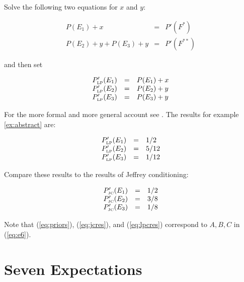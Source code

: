 \documentclass[11pt]{article} \usepackage{october} \onehalfspacing
\begin{document}
Solve the following two equations for $x$ and $y$:

\begin{equation}
  \label{eq:lpce}
  \begin{array}{rcl}
    P(E_{1})+x&=&P'(F^{*}) \\
    P(E_{2})+y+P(E_{3})+y&=&P'(F^{**})
  \end{array}
\end{equation}

and then set

\begin{equation}
  \label{eq:lpcf}
  \begin{array}{rcl}
    P'_{\mbox{\tiny LP}}(E_{1})&=&P(E_{1})+x \\
    P'_{\mbox{\tiny LP}}(E_{2})&=&P(E_{2})+y \\
    P'_{\mbox{\tiny LP}}(E_{3})&=&P(E_{3})+y
  \end{array}
\end{equation}

For the more formal and more general account see
. The results for example
\ref{ex:abstract} are:

\begin{equation}
  \label{eq:lpcres}
  \begin{array}{rcl}
    P'_{\mbox{\tiny LP}}(E_{1})&=&1/2 \\
    P'_{\mbox{\tiny LP}}(E_{2})&=&5/12 \\
    P'_{\mbox{\tiny LP}}(E_{3})&=&1/12
  \end{array}
\end{equation}

Compare these results to the results of Jeffrey conditioning:

\begin{equation}
  \label{eq:jcres}
  \begin{array}{rcl}
    P'_{\mbox{\tiny JC}}(E_{1})&=&1/2 \\
    P'_{\mbox{\tiny JC}}(E_{2})&=&3/8 \\
    P'_{\mbox{\tiny JC}}(E_{3})&=&1/8
  \end{array}
\end{equation}

Note that (\ref{eq:priors}), (\ref{eq:jcres}), and (\ref{eq:lpcres})
correspond to $A,B,C$ in (\ref{eq:e6}).

\section{Seven Expectations}
\label{fivex}
\end{document}

